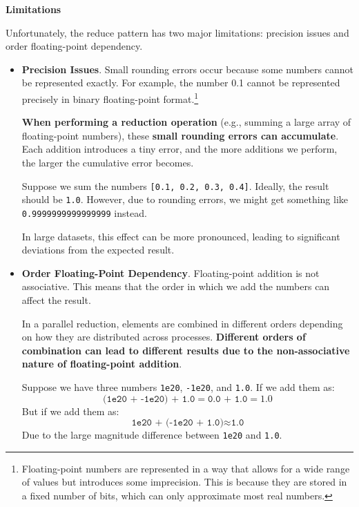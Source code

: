 \begin{flushleft}
    \textcolor{Red2}{ \textbf{Limitations}}
\end{flushleft}
Unfortunately, the reduce pattern has two major limitations: precision issues and order floating-point dependency.
\begin{itemize}[label=\textcolor{Red2}{}]
    \item \textcolor{Red2}{\textbf{Precision Issues}}. Small rounding errors occur because some numbers cannot be represented exactly. For example, the number 0.1 cannot be represented precisely in binary floating-point format.\footnote{Floating-point numbers are represented in a way that allows for a wide range of values but introduces some imprecision. This is because they are stored in a fixed number of bits, which can only approximate most real numbers.}

    \highspace
    \textbf{When performing a reduction operation} (e.g., summing a large array of floating-point numbers), these \textbf{small rounding errors can accumulate}. Each addition introduces a tiny error, and the more additions we perform, the larger the cumulative error becomes.

    \highspace
    \begin{examplebox}
        Suppose we sum the numbers \texttt{[0.1, 0.2, 0.3, 0.4]}. Ideally, the result should be \texttt{1.0}. However, due to rounding errors, we might get something like \texttt{0.9999999999999999} instead.

        In large datasets, this effect can be more pronounced, leading to significant deviations from the expected result.
    \end{examplebox}

    \newpage

    \item \textcolor{Red2}{\textbf{Order Floating-Point Dependency}}. Floating-point addition is not associative. This means that the order in which we add the numbers can affect the result.

    \highspace
    In a parallel reduction, elements are combined in different orders depending on how they are distributed across processes. \textbf{Different orders of combination can lead to different results due to the non-associative nature of floating-point addition}.

    \highspace
    \begin{examplebox}
        Suppose we have three numbers \texttt{1e20}, \texttt{-1e20}, and \texttt{1.0}. If we add them as:
        \begin{equation*}
            \texttt{(1e20 + -1e20) + 1.0} = \texttt{0.0 + 1.0} = 1.0
        \end{equation*}
        But if we add them as:
        \begin{equation*}
            \texttt{1e20 + (-1e20 + 1.0)} \approx \texttt{1.0}
        \end{equation*}
        Due to the large magnitude difference between \texttt{1e20} and \texttt{1.0}.
    \end{examplebox}
\end{itemize}
